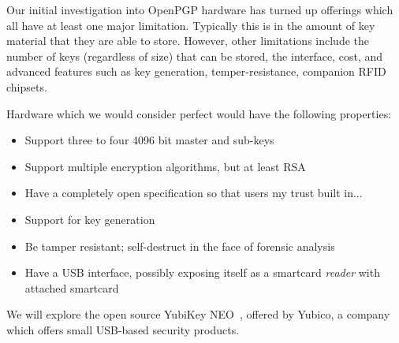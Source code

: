 \documentclass[letterpaper,twocolumn,10pt]{article}
\newcommand{\mlist}[1]{\begin{itemize}#1\end{itemize}}
\begin{document}
Our initial investigation into OpenPGP hardware has turned up offerings which
all have at least one major limitation. Typically this is in the amount of key
material that they are able to store. However, other limitations include the
number of keys (regardless of size) that can be stored, the interface, cost, and
advanced features such as key generation, temper-resistance, companion RFID
chipsets.

Hardware which we would consider perfect would have the following properties:

\mlist{
	\item Support three to four 4096 bit master and sub-keys
	\item Support multiple encryption algorithms, but at least RSA
	\item Have a completely open specification so that users my trust built in...
	\item Support for key generation
	\item Be tamper resistant; self-destruct in the face of forensic analysis
	\item Have a USB interface, possibly exposing itself as a smartcard
	     \textit{reader} with attached smartcard
}

We will explore the open source YubiKey NEO~\cite{yubikey}, offered by Yubico, a
company which offers small USB-based security products.

%
%

	\footnotesize
	
	
\end{document}
